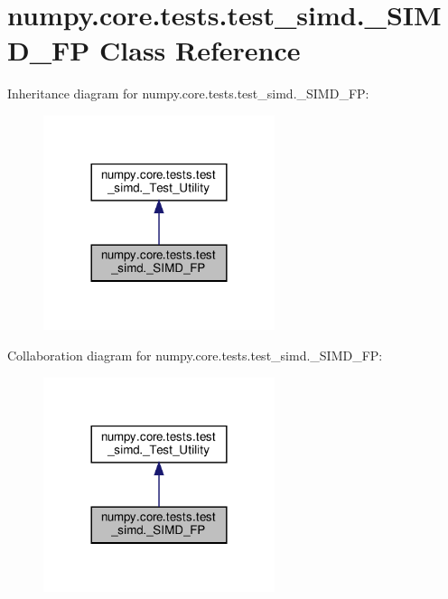 \hypertarget{classnumpy_1_1core_1_1tests_1_1test__simd_1_1__SIMD__FP}{}\section{numpy.\+core.\+tests.\+test\+\_\+simd.\+\_\+\+S\+I\+M\+D\+\_\+\+FP Class Reference}
\label{classnumpy_1_1core_1_1tests_1_1test__simd_1_1__SIMD__FP}


Inheritance diagram for numpy.\+core.\+tests.\+test\+\_\+simd.\+\_\+\+S\+I\+M\+D\+\_\+\+FP\+:
\nopagebreak
\begin{figure}[H]
\begin{center}
\leavevmode
\includegraphics[width=192pt]{classnumpy_1_1core_1_1tests_1_1test__simd_1_1__SIMD__FP__inherit__graph}
\end{center}
\end{figure}


Collaboration diagram for numpy.\+core.\+tests.\+test\+\_\+simd.\+\_\+\+S\+I\+M\+D\+\_\+\+FP\+:
\nopagebreak
\begin{figure}[H]
\begin{center}
\leavevmode
\includegraphics[width=192pt]{classnumpy_1_1core_1_1tests_1_1test__simd_1_1__SIMD__FP__coll__graph}
\end{center}
\end{figure}
